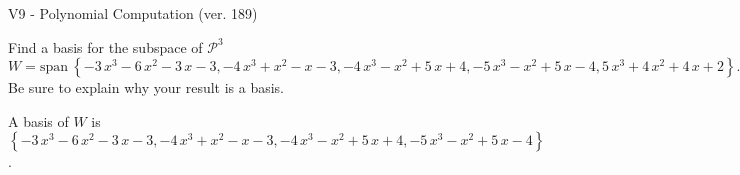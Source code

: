 \begin{exercise}
  \begin{exerciseTitle}V9 - Polynomial Computation (ver. 189)\end{exerciseTitle}
  \begin{exerciseStatement}
    Find a basis for the subspace of \(\mathcal{P}^3\) 
\[W=\mathrm{span}\ \left\{-3 \, x^{3} - 6 \, x^{2} - 3 \, x - 3 , -4 \, x^{3} + x^{2} - x - 3 , -4 \, x^{3} - x^{2} + 5 \, x + 4 , -5 \, x^{3} - x^{2} + 5 \, x - 4 , 5 \, x^{3} + 4 \, x^{2} + 4 \, x + 2\right\}.\]
 Be sure to explain why your result is a basis.


  \end{exerciseStatement}
  \begin{exerciseAnswer}
   A basis of \(W\) is  \(\left\{-3 \, x^{3} - 6 \, x^{2} - 3 \, x - 3 , -4 \, x^{3} + x^{2} - x - 3 , -4 \, x^{3} - x^{2} + 5 \, x + 4 , -5 \, x^{3} - x^{2} + 5 \, x - 4\right\}\).
  


  \end{exerciseAnswer}
\end{exercise}